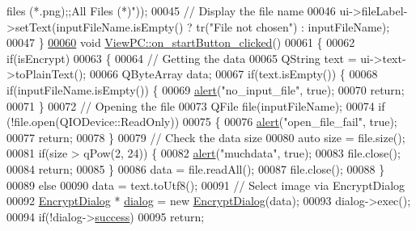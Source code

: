 \begin{DoxyCode}
{       files (*.png);;All Files (*)"}));
00045     \textcolor{comment}{// Display the file name}
00046     ui->fileLabel->setText(inputFileName.isEmpty() ? tr(\textcolor{stringliteral}{"File not chosen"}) : inputFileName);
00047 \}
\hypertarget{viewpc_8cpp_source.tex_l00060}{}\hyperlink{class_view_p_c_a456d75b7c5d3a089302a576e7359f1f4}{00060} \textcolor{keywordtype}{void} \hyperlink{class_view_p_c_a456d75b7c5d3a089302a576e7359f1f4}{ViewPC::on\_startButton\_clicked}()
00061 \{
00062     \textcolor{keywordflow}{if}(isEncrypt)
00063     \{
00064         \textcolor{comment}{// Getting the data}
00065         QString text = ui->text->toPlainText();
00066         QByteArray data;
00067         \textcolor{keywordflow}{if}(text.isEmpty()) \{
00068             \textcolor{keywordflow}{if}(inputFileName.isEmpty()) \{
00069                 \hyperlink{class_view_p_c_a7c467169467789561078abc9d4fe57bd}{alert}(\textcolor{stringliteral}{"no\_input\_file"}, \textcolor{keyword}{true});
00070                 \textcolor{keywordflow}{return};
00071             \}
00072             \textcolor{comment}{// Opening the file}
00073             QFile file(inputFileName);
00074             \textcolor{keywordflow}{if} (!file.open(QIODevice::ReadOnly))
00075             \{
00076                 \hyperlink{class_view_p_c_a7c467169467789561078abc9d4fe57bd}{alert}(\textcolor{stringliteral}{"open\_file\_fail"}, \textcolor{keyword}{true});
00077                 \textcolor{keywordflow}{return};
00078             \}
00079             \textcolor{comment}{// Check the data size}
00080             \textcolor{keyword}{auto} size = file.size();
00081             \textcolor{keywordflow}{if}(size > qPow(2, 24)) \{
00082                 \hyperlink{class_view_p_c_a7c467169467789561078abc9d4fe57bd}{alert}(\textcolor{stringliteral}{"muchdata"}, \textcolor{keyword}{true});
00083                 file.close();
00084                 \textcolor{keywordflow}{return};
00085             \}
00086             data = file.readAll();
00087             file.close();
00088         \}
00089         \textcolor{keywordflow}{else}
00090             data = text.toUtf8();
00091         \textcolor{comment}{// Select image via EncryptDialog}
00092         \hyperlink{class_encrypt_dialog}{EncryptDialog} * \hyperlink{class_view_p_c_a31abbb470fe329b44e6ffee202b903ca}{dialog} = \textcolor{keyword}{new} \hyperlink{class_encrypt_dialog}{EncryptDialog}(data);
00093         dialog->exec();
00094         \textcolor{keywordflow}{if}(!dialog->\hyperlink{class_encrypt_dialog_ada4900bcd40894d9c098c65aa4066ac9}{success})
00095             \textcolor{keywordflow}{return};

\end{DoxyCode}
